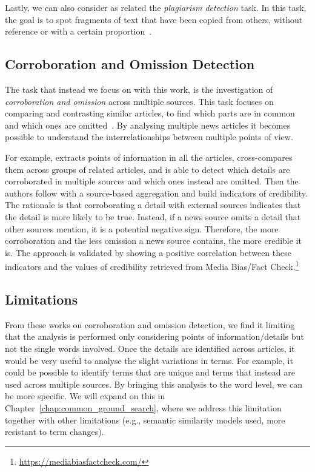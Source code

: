 Lastly, we can also consider as related the \emph{plagiarism detection} task.
In this task, the goal is to spot fragments of text that have been copied from others, without reference or with a certain proportion~\citep{stein2006near,alzahrani2010fuzzy,arabi2022improving}.


\subsection{Corroboration and Omission Detection}
\label{ssec:lit_relationships_corr_omiss}

The task that instead we focus on with this work, is the investigation of \textit{corroboration and omission} across multiple sources.
This task focuses on comparing and contrasting similar articles, to find which parts are in common and which ones are omitted~\cite{ehrhardt2021omission,bountouridis2018explaining,ko2023claimdiff}.
By analysing multiple news articles it becomes possible to understand the interrelationships between multiple points of view.

For example, \cite{bountouridis2018explaining} extracts points of information in all the articles, cross-compares them across groups of related articles, and is able to detect which details are corroborated in multiple sources and which ones instead are omitted.
Then the authors follow with a source-based aggregation and build indicators of credibility. The rationale is that corroborating a detail with external sources indicates that the detail is more likely to be true.
Instead, if a news source omits a detail that other sources mention, it is a potential negative sign.
Therefore, the more corroboration and the less omission a news source contains, the more credible it is.
The approach is validated by showing a positive correlation between these indicators and the values of credibility retrieved from Media Bias/Fact Check.\footnote{\url{https://mediabiasfactcheck.com/}}

\subsection{Limitations}

From these works on corroboration and omission detection, we find it limiting that the analysis is performed only considering points of information/details but not the single words involved.
Once the details are identified across articles, it would be very useful to analyse the slight variations in terms.
For example, it could be possible to identify terms that are unique and terms that instead are used across multiple sources. By bringing this analysis to the word level, we can be more specific.
We will expand on this in Chapter~\ref{chap:common_ground_search}, where we address this limitation together with other limitations (e.g., semantic similarity models used, more resistant to term changes).

